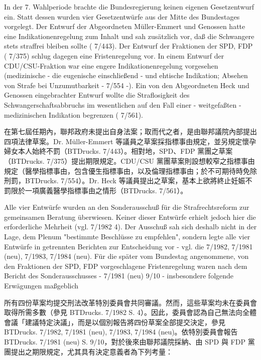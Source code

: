 \documentclass[12pt]{article}
\begin{document}
\syncleft
\begin{sourcepara}
In der 7. Wahlperiode brachte die Bundesregierung keinen eigenen Gesetzentwurf ein. Statt dessen wurden vier Gesetzentwürfe aus der Mitte des Bundestages vorgelegt. Der Entwurf der Abgeordneten \abbrDr{} Müller-Emmert und Genossen hatte eine Indikationenregelung zum Inhalt und sah zusätzlich vor, daß die Schwangere stets straffrei bleiben sollte (\abbrBTDrucks{} 7/443). Der Entwurf der Fraktionen der SPD, FDP (\abbrBTDrucks{} 7/375) schlug dagegen eine Fristenregelung vor. In einem Entwurf der CDU/CSU-Fraktion war eine engere Indikationenregelung vorgesehen (medizinische - die eugenische einschließend - und ehtische Indikation; Absehen von Strafe bei Unzumutbarkeit - \abbrBTDrucks{} 7/554 -). Ein von den Abgeordneten \abbrDr{} Heck und Genossen eingebrachter Entwurf wollte die Straflosigkeit des Schwangerschaftsabbruchs im wesentlichen auf den Fall einer - weitgefaßten - medizinischen Indikation begrenzen (\abbrBTDrucks{} 7/561).
\end{sourcepara}
\begin{transpara}
在第七屆任期內，聯邦政府未提出自身法案；取而代之者，是由聯邦議院內部提出四項法律草案。Dr. Müller-Emmert 等議員之草案採指標事由規定，並另規定懷孕婦女本人始終不罰（BTDrucks. 7/443）。相對地，SPD、FDP 黨團之草案（BTDrucks. 7/375）提出期限規定。CDU/CSU 黨團草案則設想較窄之指標事由規定（醫學指標事由，包含優生指標事由，以及倫理指標事由；於不可期待時免除刑罰，BTDrucks. 7/554）。Dr. Heck 等議員提出之草案，基本上欲將終止妊娠不罰限於一項廣義醫學指標事由之情形（BTDrucks. 7/561）。
\end{transpara}

\syncleft
\begin{sourcepara}
Alle vier Entwürfe wurden an den Sonderausschuß für die Strafrechtsreform zur gemeinsamen Beratung überwiesen. Keiner dieser Entwürfe erhielt jedoch hier die erforderliche Mehrheit (vgl. \abbrBTDrucks{} 7/1982 \abbrS{} 4). Der Ausschuß sah sich deshalb nicht in der Lage, dem Plenum "bestimmte Beschlüsse zu empfehlen", sondern legte alle vier Entwürfe in getrennten Berichten zur Entscheidung vor - vgl. die \abbrBTDrucks{} 7/1982, 7/1981 (neu), 7/1983, 7/1984 (neu). Für die später vom Bundestag angenommene, von den Fraktionen der SPD, FDP vorgeschlagene Fristenregelung waren nach dem Bericht des Sonderausschusses - \abbrBTDrucks{} 7/1981 (neu) \abbrS{} 9/10 - insbesondere folgende Erwägungen maßgeblich
\end{sourcepara}
\begin{transpara}
所有四份草案均提交刑法改革特別委員會共同審議。然而，這些草案均未在委員會取得所需多數（參見 BTDrucks. 7/1982 S. 4）。因此，委員會認為自己無法向全體會議「建議特定決議」，而是以個別報告將四份草案全部提交決定，參見 BTDrucks. 7/1982, 7/1981 (neu), 7/1983, 7/1984 (neu)。依特別委員會報告 BTDrucks. 7/1981 (neu) S. 9/10，對於後來由聯邦議院採納、由 SPD 與 FDP 黨團提出之期限規定，尤其具有決定意義者為下列考量：
\end{transpara}
\end{document}
